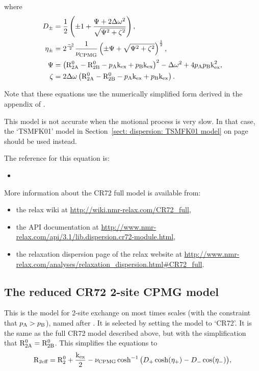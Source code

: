 where
\begin{align}
    D_\pm    &= \frac{1}{2} \left( \pm1 + \frac{\Psi + 2\Delta\omega^2}{\sqrt{\Psi^2 + \zeta^2}} \right) , \\
    \eta_\pm &= 2^{\frac{-3}{2}}\frac{1}{\nu_\textrm{CPMG}} \left( \pm\Psi + \sqrt{\Psi^2 + \zeta^2} \right)^{\frac{1}{2}} , \\
    \Psi     &= \left( \mathrm{R}_\mathrm{2A}^0 - \mathrm{R}_\mathrm{2B}^0 - p_\textrm{A}\textrm{k}_\textrm{ex} + p_\textrm{B}\textrm{k}_\textrm{ex} \right)^2 - \Delta\omega^2 + 4p_\textrm{A}p_\textrm{B}\textrm{k}_\textrm{ex}^2 , \\
    \zeta    &= 2\Delta\omega \left( \mathrm{R}_\mathrm{2A}^0 - \mathrm{R}_\mathrm{2B}^0 - p_\textrm{A}\textrm{k}_\textrm{ex} + p_\textrm{B}\textrm{k}_\textrm{ex} \right).
\end{align}

Note that these equations use the numerically simplified form derived in the appendix of \citet{Davis94}.

This model is not accurate when the motional process is very slow.
In that case, the `TSMFK01' model in Section~\ref{sect: dispersion: TSMFK01 model} on page~\pageref{sect: dispersion: TSMFK01 model} should be used instead.

The reference for this equation is:
\begin{itemize}
  \item {}
\end{itemize}

More information about the CR72 full model is available from:
\begin{itemize}
  \item the relax wiki at \url{http://wiki.nmr-relax.com/CR72\_full},
  \item the API documentation at \url{http://www.nmr-relax.com/api/3.1/lib.dispersion.cr72-module.html},
  \item the relaxation dispersion page of the relax website at \url{http://www.nmr-relax.com/analyses/relaxation\_dispersion.html#CR72\_full}.
\end{itemize}



\subsection{The reduced CR72 2-site CPMG model}
\label{sect: dispersion: CR72 model}

This is the model for 2-site exchange on most times scales (with the constraint that $p_\textrm{A} > p_\textrm{B}$), named after \citet{CarverRichards72}.
It is selected by setting the model to `CR72'.
It is the same as the full CR72 model described above, but with the simplification that $\mathrm{R}_\mathrm{2A}^0 = \mathrm{R}_\mathrm{2B}^0$.
This simplifies the equations to
\begin{equation}
    \mathrm{R}_\textrm{2eff} = \mathrm{R}_2^0 + \frac{\textrm{k}_\textrm{ex}}{2} - \nu_\textrm{CPMG}\cosh^{-1} \big( D_+\cosh(\eta_+) - D_-\cos(\eta_-) \big) ,
\end{equation}

